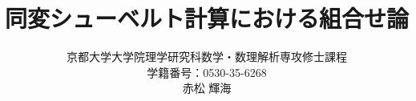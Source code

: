 \documentclass{ltjsarticle}
\title{同変シューベルト計算における組合せ論}
\author{京都大学大学院理学研究科数学・数理解析専攻修士課程\\学籍番号：0530-35-6268\\赤松 輝海}
\date{}
\begin{document}
\maketitle

\begin{abstract}
  
\end{abstract}

\newpage
\tableofcontents

\newpage

\newpage

\newpage



\newpage


\newpage

\end{document}
